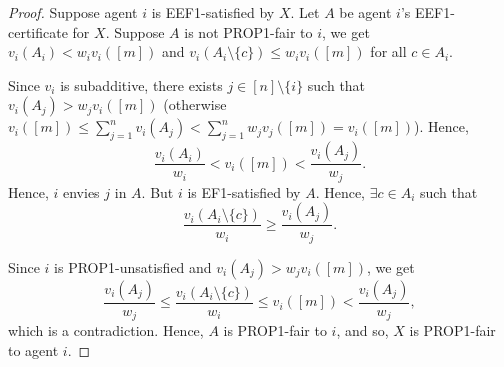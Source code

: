 \begin{proof}
Suppose agent $i$ is EEF1-satisfied by $X$.
Let $A$ be agent $i$'s EEF1-certificate for $X$.
Suppose $A$ is not PROP1-fair to $i$, we get $v_i(A_i) < w_iv_i([m])$
and $v_i(A_i \setminus \{c\}) \le w_iv_i([m])$ for all $c \in A_i$.

Since $v_i$ is subadditive, there exists $j \in [n] \setminus \{i\}$
such that $v_i(A_j) > w_jv_i([m])$
(otherwise $v_i([m]) \le \sum_{j=1}^n v_i(A_j) < \sum_{j=1}^n w_jv_j([m]) = v_i([m])$). Hence,
\[ \frac{v_i(A_i)}{w_i} < v_i([m]) < \frac{v_i(A_j)}{w_j}. \]
Hence, $i$ envies $j$ in $A$. But $i$ is EF1-satisfied by $A$.
Hence, $\exists c \in A_i$ such that
\[ \frac{v_i(A_i \setminus \{c\})}{w_i} \ge \frac{v_i(A_j)}{w_j}. \]

Since $i$ is PROP1-unsatisfied and $v_i(A_j) > w_jv_i([m])$, we get
\[ \frac{v_i(A_j)}{w_j} \le \frac{v_i(A_i \setminus \{c\})}{w_i} \le v_i([m]) < \frac{v_i(A_j)}{w_j}, \]
which is a contradiction.
Hence, $A$ is PROP1-fair to $i$, and so, $X$ is PROP1-fair to agent $i$.
\end{proof}

